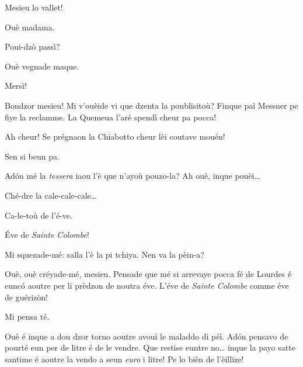 \begin{drama}

\Seurspeaks Mesieu lo vallet!

\Valletspeaks Ouè madama.

\Seurspeaks Poui-dzò passì?

\Valletspeaks Ouè vegnade maque.

\Seurspeaks Mersì!


\Seurspeaks{} Bondzor mesieu! Mi v'ouèide vi que dzenta la poublisitoù? Finque paì Messner pe fiye la reclamme. La Quemeua l'aré spendì cheur pa pocca!

\Pierluigispeaks Ah cheur! Se prégnaon la Chiabotto cheur lèi coutave mouén!

\Seurspeaks Sen si beun pa.


\Seurspeaks{} Ad\'on mé la \textit{tessera} iaou l'è que n'ayoù pouzo-la? Ah ouè, inque pouèi\ldots


\Machinaspeaks Ché-dre la cale-cale-cale\ldots


\Machinaspeaks Ca-le-toù de l'é-ve.

\Seurspeaks  \'Eve de \textit{Sainte Colombe}!

\Pierluigispeaks Mi squezade-mé: salla l'è la pi tchiya. Nen va la pèin-a?

\Seurspeaks Ouè, ouè créyade-mé, mesieu. Pensade que mé si arrevaye pocca fé de Lourdes é eunc\'o aoutre per li prèdzon de noutra éve. L'éve de \textit{Sainte Colombe} comme éve de guérizòn!

\Pierluigispeaks Mi pensa té.

\Seurspeaks Ouè é inque a dou dzor torno aoutre avouì le maladdo di péì. Ad\'on pensavo de pourté eun per de litre é de le vendre. Que restise euntre no\ldots {} inque la payo satte santime é aoutre la vendo a seun \textit{euro} i litre! Pe lo bièn de l’èillize!


\end{drama}
